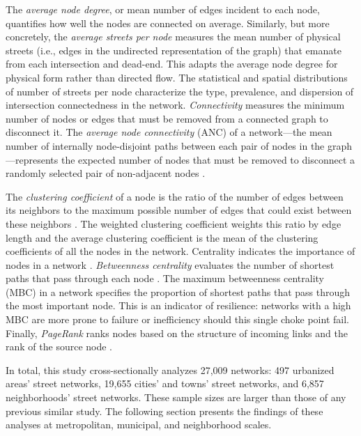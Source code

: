 \documentclass{article}
\begin{document}
The \emph{average node degree}, or mean number of edges incident to each node, quantifies how well the nodes are connected on average. Similarly, but more concretely, the \emph{average streets per node} measures the mean number of physical streets (i.e., edges in the undirected representation of the graph) that emanate from each intersection and dead-end. This adapts the average node degree for physical form rather than directed flow. The statistical and spatial distributions of number of streets per node characterize the type, prevalence, and dispersion of intersection connectedness in the network. \emph{Connectivity} measures the minimum number of nodes or edges that must be removed from a connected graph to disconnect it. The \emph{average node connectivity} (ANC) of a network---the mean number of internally node-disjoint paths between each pair of nodes in the graph---represents the expected number of nodes that must be removed to disconnect a randomly selected pair of non-adjacent nodes \cite{beineke_average_2002,dankelmann_bounds_2003}. 

The \emph{clustering coefficient} of a node is the ratio of the number of edges between its neighbors to the maximum possible number of edges that could exist between these neighbors \cite{jiang_topological_2004, opsahl_clustering_2009}. The weighted clustering coefficient weights this ratio by edge length and the average clustering coefficient is the mean of the clustering coefficients of all the nodes in the network. Centrality indicates the importance of nodes in a network \cite{huang_trajgraph:_2016, zhong_revealing_2017}. \emph{Betweenness centrality} evaluates the number of shortest paths that pass through each node \cite{barthelemy_betweenness_2004}. The maximum betweenness centrality (MBC) in a network specifies the proportion of shortest paths that pass through the most important node. This is an indicator of resilience: networks with a high MBC are more prone to failure or inefficiency should this single choke point fail. Finally, \emph{PageRank} ranks nodes based on the structure of incoming links and the rank of the source node \cite{brin_anatomy_1998, jiang_predicting_2008, agryzkov_algorithm_2012, chin_geographically_2015, gleich_pagerank_2015}.

In total, this study cross-sectionally analyzes 27,009 networks: 497 urbanized areas' street networks, 19,655 cities' and towns' street networks, and 6,857 neighborhoods' street networks. These sample sizes are larger than those of any previous similar study. The following section presents the findings of these analyses at metropolitan, municipal, and neighborhood scales.
\end{document}
